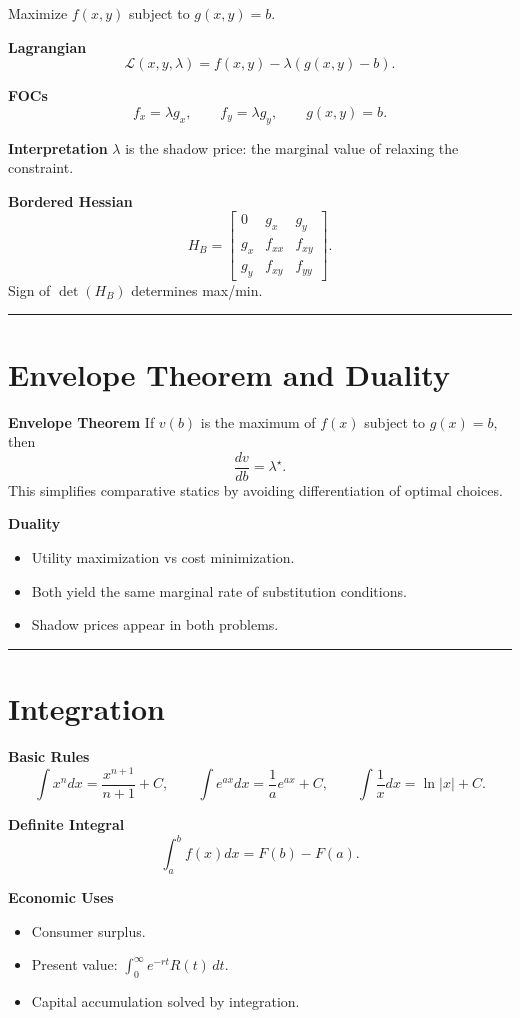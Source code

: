 \documentclass[12pt]{article}
\begin{document}
Maximize \(f(x,y)\) subject to \(g(x,y)=b\).

\textbf{Lagrangian}
\[
\mathcal{L}(x,y,\lambda)=f(x,y)-\lambda(g(x,y)-b).
\]

\textbf{FOCs}
\[
f_x = \lambda g_x,\qquad f_y = \lambda g_y,\qquad g(x,y)=b.
\]

\textbf{Interpretation}
\(\lambda\) is the shadow price: the marginal value of relaxing the constraint.

\textbf{Bordered Hessian}
\[
H_B =
\begin{bmatrix}
0 & g_x & g_y\\
g_x & f_{xx} & f_{xy}\\
g_y & f_{xy} & f_{yy}
\end{bmatrix}.
\]
Sign of \(\det(H_B)\) determines max/min.

\hrule
\vspace{10pt}

\section*{Envelope Theorem and Duality}

\textbf{Envelope Theorem}
If \(v(b)\) is the maximum of \(f(x)\) subject to \(g(x)=b\), then
\[
\frac{dv}{db}=\lambda^\star.
\]
This simplifies comparative statics by avoiding differentiation of optimal choices.

\textbf{Duality}
\begin{itemize}
    \item Utility maximization vs cost minimization.
    \item Both yield the same marginal rate of substitution conditions.
    \item Shadow prices appear in both problems.
\end{itemize}

\hrule
\vspace{10pt}

\section*{Integration}

\textbf{Basic Rules}
\[
\int x^n dx = \frac{x^{n+1}}{n+1}+C,\qquad
\int e^{ax} dx = \frac{1}{a}e^{ax}+C,\qquad
\int \frac{1}{x}dx = \ln|x|+C.
\]

\textbf{Definite Integral}
\[
\int_a^b f(x)dx = F(b)-F(a).
\]

\textbf{Economic Uses}
\begin{itemize}
    \item Consumer surplus.
    \item Present value: \(\int_0^\infty e^{-rt}R(t)\,dt\).
    \item Capital accumulation solved by integration.
\end{itemize}
\end{document}
